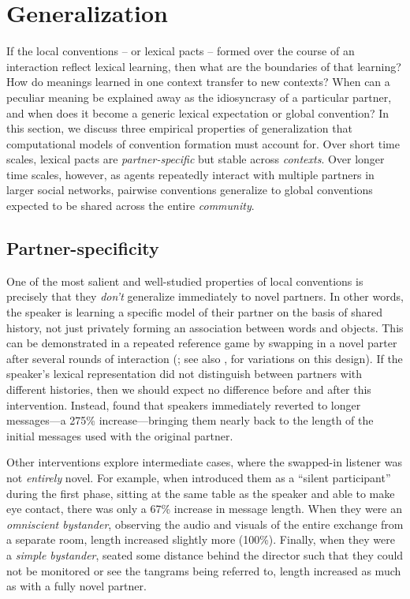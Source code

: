 \documentclass[11pt, floatsintext, jou]{apa6}
\begin{document}
\section{Generalization}

If the local conventions -- or lexical pacts -- formed over the course of an interaction reflect lexical learning, then what are the boundaries of that learning? How do meanings learned in one context transfer to new contexts? When can a peculiar meaning be explained away as the idiosyncrasy of a particular partner, and when does it become a generic lexical expectation or global convention? In this section, we discuss three empirical properties of generalization that computational models of convention formation must account for. Over short time scales, lexical pacts are \emph{partner-specific} but stable across \emph{contexts}. Over longer time scales, however, as agents repeatedly interact with multiple partners in larger social networks, pairwise conventions generalize to global conventions expected to be shared across the entire \emph{community}.

\subsection{Partner-specificity}

One of the most salient and well-studied properties of local conventions is precisely that they \emph{don't} generalize immediately to novel partners. In other words, the speaker is learning a specific model of their partner on the basis of shared history, not just privately forming an association between words and objects. This can be demonstrated in a repeated reference game by  swapping in a novel parter after several rounds of interaction (; see also ,  for variations on this design). If the speaker's lexical representation did not distinguish between partners with different histories, then we should expect no difference before and after this intervention. Instead,  found that speakers immediately reverted to longer messages---a 275\% increase---bringing them nearly back to the length of the initial messages used with the original partner. 

Other interventions explore intermediate cases, where the swapped-in listener was not \emph{entirely} novel. For example, when  introduced them as a ``silent participant'' during the first phase, sitting at the same table as the speaker and able to make eye contact, there was only a 67\% increase in message length. When they were an \emph{omniscient bystander}, observing the audio and visuals of the entire exchange from a separate room, length increased slightly more (100\%). Finally, when they were a \emph{simple bystander}, seated some distance behind the director such that they could not be monitored or see the tangrams being referred to, length increased as much as with a fully novel partner. 
\end{document}
